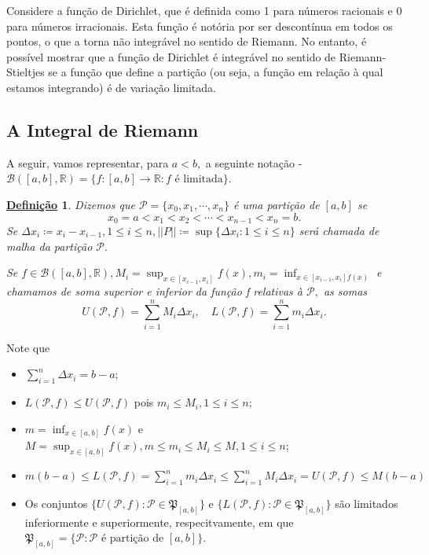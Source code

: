 \documentclass{article}
\newtheorem*{def*}{\underline{Defini\c c\~ao}}
\begin{document}
Considere a função de Dirichlet, que é definida como 1 para números racionais
e 0 para números irracionais. Esta função é notória por ser descontínua em todos
os pontos, o que a torna não integrável no sentido de Riemann.
No entanto, é possível mostrar que a função de Dirichlet é integrável no sentido
de Riemann-Stieltjes se a função que define a partição
(ou seja, a função em relação à qual estamos integrando) é de variação limitada.

\subsection{A Integral de Riemann}
A seguir, vamos representar, para \(a < b,\) a seguinte nota\c cão - \(\mathcal{B}([a,b], \mathbb{R})=\{f:[a,b]\rightarrow \mathbb{R}: f\text{ é limitada}\}.\)
\begin{def*}
  Dizemos que \(\mathcal{P}=\{x_{0}, x_{1}, \cdots, x_{n}\}\) é uma parti\c cão de \([a, b]\) se 
    \[
      x_{0} = a < x_{1} < x_{2} < \cdots < x_{n-1} < x_{n} = b.
    \]
    Se \(\Delta x_{i}\coloneqq x_{i} - x_{i-1}, 1\leq i\leq n, ||P||\coloneqq \sup\{\Delta x_{i}: 1\leq i\leq n\}\) será chamada de
    malha da parti\c cão \(\mathcal{P}.\)

    Se \(f\in \mathcal{B}([a, b], \mathbb{R}), M_{i}=\sup_{x\in[x_{i-1},x_{i}]}f(x), m_{i}=\inf_{x\in[x_{i-1}, x_{i}]f(x)}\) e
    chamamos de soma superior e inferior da fun\c cão f relativas à \(\mathcal{P},\) as somas 
      \[
        U(\mathcal{P}, f) = \sum\limits_{i=1}^{n}M_{i}\Delta x_{i},\quad L(\mathcal{P}, f)=\sum\limits_{i=1}^{n}m_{i}\Delta x_{i}.
      \]
\end{def*}
  Note que 
 \begin{itemize}
   \item \(\sum\limits_{i=1}^{n}\Delta x_{i} = b-a\);
   \item \(L(\mathcal{P}, f)\leq U(\mathcal{P}, f)\) pois \(m_{i}\leq M_{i}, 1\leq i\leq n\);
   \item \(m=\inf_{x\in[a, b]}f(x)\) e \(M=\sup_{x\in[a, b]}f(x), m\leq m_{i}\leq M_{i}\leq M, 1\leq i\leq n\);
   \item \(m(b-a)\leq L(\mathcal{P}, f) = \sum\limits_{i=1}^{n}m_{i}\Delta x_{i}\leq \sum\limits_{i=1}^{n} M_{i}\Delta x_{i}=U(\mathcal{P}, f)\leq M(b-a)\)
   \item Os conjuntos \(\{U(\mathcal{P}, f): \mathcal{P}\in \mathfrak{P}_{[a, b]}\}\) e
     \(\{L(\mathcal{P}, f): \mathcal{P}\in \mathfrak{P}_{[a, b]}\}\) são limitados inferiormente e superiormente, respecitvamente,
     em que \(\mathfrak{P}_{[a, b]} = \{\mathcal{P}: \mathcal{P}\text{ é parti\c cão de }[a, b]\}\).
 \end{itemize}
\end{document}
